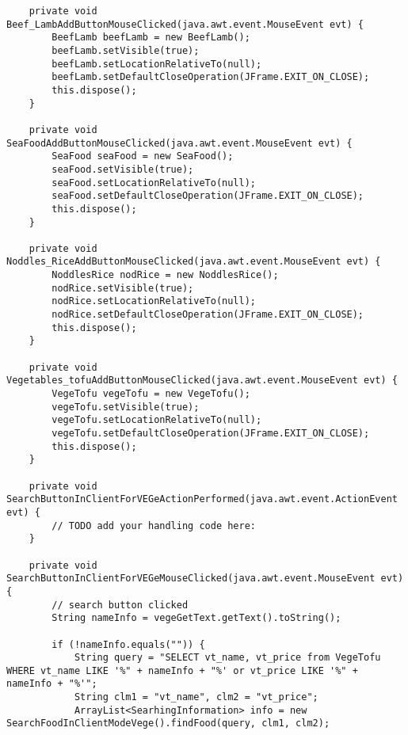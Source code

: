 \documentclass[12pt,a4paper]{article}
\begin{document}
\begin{lstlisting}
    private void Beef_LambAddButtonMouseClicked(java.awt.event.MouseEvent evt) {                                                
        BeefLamb beefLamb = new BeefLamb();
        beefLamb.setVisible(true);
        beefLamb.setLocationRelativeTo(null);
        beefLamb.setDefaultCloseOperation(JFrame.EXIT_ON_CLOSE);
        this.dispose();
    }                                               

    private void SeaFoodAddButtonMouseClicked(java.awt.event.MouseEvent evt) {                                              
        SeaFood seaFood = new SeaFood();
        seaFood.setVisible(true);
        seaFood.setLocationRelativeTo(null);
        seaFood.setDefaultCloseOperation(JFrame.EXIT_ON_CLOSE);
        this.dispose();
    }                                             

    private void Noddles_RiceAddButtonMouseClicked(java.awt.event.MouseEvent evt) {                                                   
        NoddlesRice nodRice = new NoddlesRice();
        nodRice.setVisible(true);
        nodRice.setLocationRelativeTo(null);
        nodRice.setDefaultCloseOperation(JFrame.EXIT_ON_CLOSE);
        this.dispose();
    }                                                  

    private void Vegetables_tofuAddButtonMouseClicked(java.awt.event.MouseEvent evt) {                                                      
        VegeTofu vegeTofu = new VegeTofu();
        vegeTofu.setVisible(true);
        vegeTofu.setLocationRelativeTo(null);
        vegeTofu.setDefaultCloseOperation(JFrame.EXIT_ON_CLOSE);
        this.dispose();
    }                                                     

    private void SearchButtonInClientForVEGeActionPerformed(java.awt.event.ActionEvent evt) {                                                            
        // TODO add your handling code here:
    }                                                           

    private void SearchButtonInClientForVEGeMouseClicked(java.awt.event.MouseEvent evt) {                                                         
        // search button clicked
        String nameInfo = vegeGetText.getText().toString();

        if (!nameInfo.equals("")) {
            String query = "SELECT vt_name, vt_price from VegeTofu WHERE vt_name LIKE '%" + nameInfo + "%' or vt_price LIKE '%" + nameInfo + "%'";
            String clm1 = "vt_name", clm2 = "vt_price";
            ArrayList<SearhingInformation> info = new SearchFoodInClientModeVege().findFood(query, clm1, clm2);


\end{lstlisting}
\end{document}
